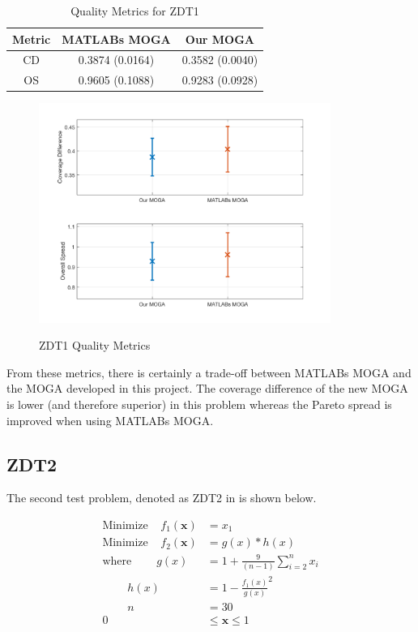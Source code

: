 \documentclass{article}
\begin{document}
\begin{table}[H]
\caption{Quality Metrics for ZDT1} 
\centering 
\begin{tabular}{|c|c|c|} 
\hline\hline  
Metric & MATLABs MOGA & Our MOGA \\ \hline
CD & 0.3874 (0.0164) &  0.3582 (0.0040) \\ \hline
OS & 0.9605 (0.1088) & 0.9283 (0.0928) \\ \hline
\end{tabular}
\label{tab:ZDT1} 
\end{table}
\begin{figure}[H]
  \caption{ZDT1 Quality Metrics}
  \centering
  \includegraphics[width=0.85\textwidth]{ZDT1_QM.png}  
  \label{fig:ZDT1_QM}
\end{figure}

\noindent From these metrics, there is certainly a trade-off between MATLABs MOGA and the MOGA developed in this project. The coverage difference of the new MOGA is lower (and therefore superior) in this problem whereas the Pareto spread is improved when using MATLABs MOGA. 


\newpage
\subsection{ZDT2} 
The second test problem, denoted as ZDT2 in \cite{deb2001multi} is shown below. 


\begin{align*}
\textrm{Minimize} ~~~~~ f_1(\textbf{x}) &= x_1 \\
\textrm{Minimize} ~~~~~ f_2(\textbf{x}) &= g(x)*h(x) \\
\textrm{where} ~~~~~~~~~~ g(x) &= 1+\frac{9}{(n-1)}\sum_{i=2}^{n}x_i \\
~~~~~~~~~~ h(x) &= 1- \frac{f_1(x)}{g(x)}^2 \\
~~~~~~~~~~ n &= 30 \\
0 &\leq  \textbf{x}  \leq 1 \\
\end{align*}
\end{document}
